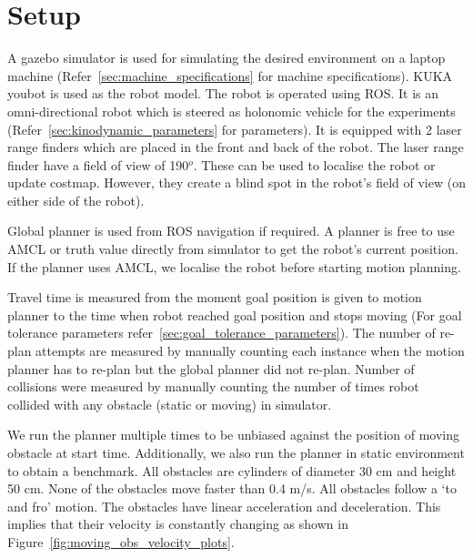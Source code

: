 \section{Setup}
\label{sec:setup}

A gazebo simulator\cite{koenig2004design} is used for simulating the desired environment on a laptop
machine (Refer~\ref{sec:machine_specifications} for machine specifications).
KUKA youbot\cite{bischoff2011kuka} is used as the robot model. The robot is operated using ROS\cite{quigley2009ros}. It is an
omni-directional robot which is steered as holonomic vehicle for the experiments 
(Refer~\ref{sec:kinodynamic_parameters} for parameters). It is equipped with 2 laser range finders
which are placed in the front and back of the robot. The laser range finder have a field of view of
190$^o$. These can be used to localise the robot or update costmap\cite{costmap}. However, they create
a blind spot in the robot's field of view (on either side of the robot).

Global planner\cite{globalPlanner} is used from ROS navigation\cite{rosnavigation} if required. 
A planner is free to use AMCL\cite{amcl} or truth value directly from simulator to get the
robot's current position. If the planner uses AMCL, we localise the robot before starting
motion planning.

Travel time is measured from the moment goal position is given to motion planner to the 
time when robot reached goal position and stops moving (For goal tolerance parameters refer~\ref{sec:goal_tolerance_parameters}).
The number of re-plan attempts are measured by manually counting each instance when the motion
planner has to re-plan but the global planner did not re-plan.
Number of collisions were measured by manually counting the number of times robot collided with any
obstacle (static or moving) in simulator.

We run the planner multiple times to be unbiased against the position of moving obstacle 
at start time.
Additionally, we also run the planner in static environment to obtain a benchmark.
All obstacles are cylinders of diameter 30 cm and height 50 cm. None of the obstacles move 
faster than 0.4 m/s. All obstacles follow a `to and fro' motion. The obstacles have 
linear acceleration and deceleration. This implies that their velocity is constantly changing as shown
in Figure~\ref{fig:moving_obs_velocity_plots}.

